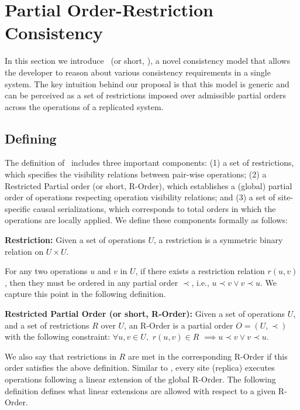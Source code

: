 \section{Partial Order-Restriction Consistency}
\label{ch:por:sect:pordef}
In this section we introduce \PRCNF\ (or short, \PRCN), a novel consistency model that allows
the developer to reason about various consistency requirements in a single
system. The key intuition behind our proposal is that this model is generic and 
can be perceived as a set of restrictions imposed over admissible partial orders 
across the operations of a replicated system.

\subsection{Defining \PRCN}
The definition of \PRCN\ includes three important components: (1) a set of restrictions, which
specifies the visibility relations between pair-wise operations; (2) a Restricted Partial order (or short, R-Order), which
establishes a (global) partial order of operations respecting operation visibility relations; and (3) a set of site-specific causal serializations,
which corresponds to total orders in which the operations are locally applied. We define
these components formally as follows:

\begin{mydef}
\textbf{Restriction: } Given a set of operations $U$, a restriction is a symmetric binary relation on $U\times U$.
\label{def:restr}
\end{mydef}

For any two operations $u$ and $v$ in $U$, if there exists a restriction relation $r(u, v)$, 
then they must be ordered in any partial order $\prec$, i.e., $u\prec v \vee v\prec u$. We capture this point
in the following definition.

\begin{mydef}
\textbf{Restricted Partial Order (or short, R-Order): } Given a
set of operations $U$, and a set of restrictions $R$ over $U$, an R-Order is a partial order
$O = (U, \prec)$ with the following constraint: $\forall u, v\in U,$ $r(u, v)\in R$ $\implies u\prec v\vee v\prec u$.
\label{def:rorder}
\end{mydef}

We also say that restrictions in $R$ are met in the corresponding R-Order if this order
satisfies the above definition. Similar to \RBCN, every site (replica) executes operations following a linear
extension of the global R-Order. The following definition defines what linear extensions are allowed with respect to
a given R-Order.

